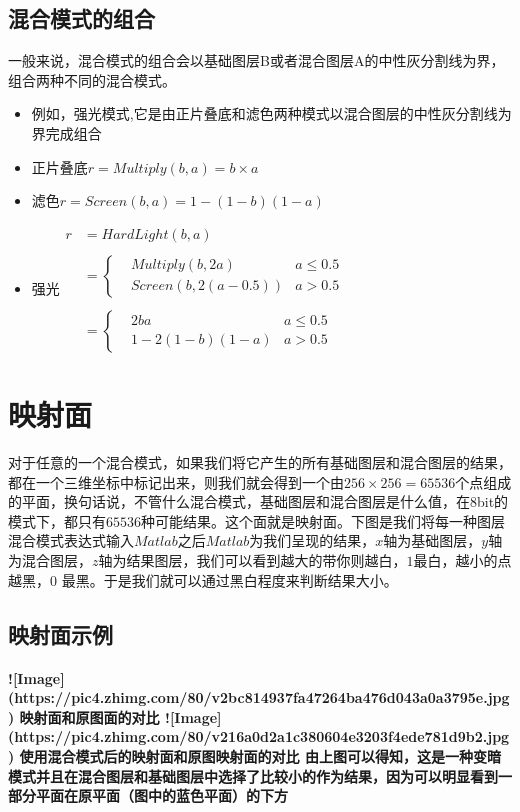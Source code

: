 \subsection{ 混合模式的组合}
一般来说，混合模式的组合会以基础图层B或者混合图层A的中性灰分割线为界，组合两种不同的混合模式。
\begin{itemize}
	\item 例如，强光模式,它是由正片叠底和滤色两种模式以混合图层的中性灰分割线为界完成组合
	\item 正片叠底$r=Multiply(b,a)=b\times a$
	\item 滤色$r=Screen(b,a)=1-(1-b)(1-a)$
	\item 强光$\begin{aligned}
		r&=HardLight(b,a)\\\\&=\left\{ \begin{aligned}&Multiply(b,2a)&a\leq0.5\\ &Screen(b,2(a-0.5))&a > 0.5\end{aligned}\right.\\\\&=\left\{ \begin{aligned}&2ba&a\leq0.5\\ &1-2(1-b)(1-a)&a > 0.5\end{aligned}\right.
	\end{aligned}$
\end{itemize}
\section{映射面}
对于任意的一个混合模式，如果我们将它产生的所有基础图层和混合图层的结果，都在一个三维坐标中标记出来，则我们就会得到一个由$256\times 256=65536$个点组成的平面，换句话说，不管什么混合模式，基础图层和混合图层是什么值，在8bit的模式下，都只有$65536$种可能结果。这个面就是映射面。下图是我们将每一种图层混合模式表达式输入$Matlab$之后$Matlab$为我们呈现的结果，$x$轴为基础图层，$y$轴为混合图层，$z$轴为结果图层，我们可以看到越大的带你则越白，$1$最白，越小的点越黑，$0$ 最黑。于是我们就可以通过黑白程度来判断结果大小。
\subsection{ 映射面示例}
\paragraph{![Image](https://pic4.zhimg.com/80/v2bc814937fa47264ba476d043a0a3795e.jpg)
	映射面和原图面的对比
	![Image](https://pic4.zhimg.com/80/v216a0d2a1c380604e3203f4ede781d9b2.jpg)
	使用混合模式后的映射面和原图映射面的对比
	由上图可以得知，这是一种变暗模式并且在混合图层和基础图层中选择了比较小的作为结果，因为可以明显看到一部分平面在原平面（图中的蓝色平面）的下方
}
